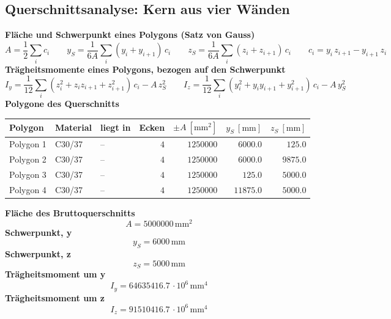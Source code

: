 \documentclass[11pt,a4paper]{article}
\begin{document}
\subsection{Querschnittsanalyse: Kern aus vier Wänden}
\noindent\textbf{Fläche und Schwerpunkt eines Polygons (Satz von Gauss)}
\begin{equation*}
A = \frac{1}{2} \sum_i c_i \qquad y_S = \frac{1}{6A} \sum_i (y_i + y_{i+1})\, c_i \qquad z_S = \frac{1}{6A} \sum_i (z_i + z_{i+1})\, c_i \qquad c_i = y_i\, z_{i+1} - y_{i+1}\, z_i
\end{equation*}
\noindent\textbf{Trägheitsmomente eines Polygons, bezogen auf den Schwerpunkt}
\begin{equation*}
I_y = \frac{1}{12} \sum_i (z_i^2 + z_i z_{i+1} + z_{i+1}^2)\, c_i - A\, z_S^2\qquad I_z = \frac{1}{12} \sum_i (y_i^2 + y_i y_{i+1} + y_{i+1}^2)\, c_i - A\, y_S^2
\end{equation*}
\noindent\textbf{Polygone des Querschnitts}
\begin{longtable}{lllrrrr}
\hline
Polygon & Material & liegt in & Ecken & $\pm A\ [\mathrm{mm}^2]$ & $y_S\ [\mathrm{mm}]$ & $z_S\ [\mathrm{mm}]$ \\
\hline
\endhead
Polygon 1 & C30/37 & – & $4$ & $1250000$ & $6000.0$ & $125.0$ \\
Polygon 2 & C30/37 & – & $4$ & $1250000$ & $6000.0$ & $9875.0$ \\
Polygon 3 & C30/37 & – & $4$ & $1250000$ & $125.0$ & $5000.0$ \\
Polygon 4 & C30/37 & – & $4$ & $1250000$ & $11875.0$ & $5000.0$ \\
\hline
\end{longtable}
\noindent\textbf{Fläche des Bruttoquerschnitts}
\begin{equation*}
A = 5000000\,\mathrm{mm}^{2}
\end{equation*}
\noindent\textbf{Schwerpunkt, y}
\begin{equation*}
y_S = 6000\,\mathrm{mm}
\end{equation*}
\noindent\textbf{Schwerpunkt, z}
\begin{equation*}
z_S = 5000\,\mathrm{mm}
\end{equation*}
\noindent\textbf{Trägheitsmoment um y}
\begin{equation*}
I_y = 64635416.7\,\cdot 10^{6}\,\mathrm{mm}^{4}
\end{equation*}
\noindent\textbf{Trägheitsmoment um z}
\begin{equation*}
I_z = 91510416.7\,\cdot 10^{6}\,\mathrm{mm}^{4}
\end{equation*}
\end{document}
